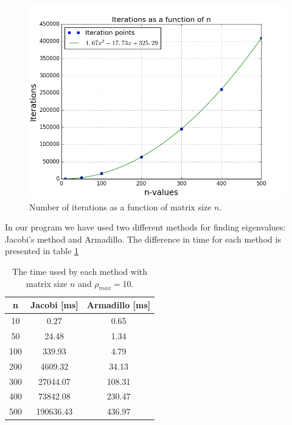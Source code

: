 \documentclass{article}
\begin{document}
\begin{figure}[H]
\centering
\includegraphics[scale=0.5]{../figures/iterations.png}
\caption{Number of iterations as a function of matrix size $n$.}
\label{fig:iterations}
\end{figure}
In our program we have used two different methods for finding eigenvalues: Jacobi's method and Armadillo. The difference in time for each method is presented in table \ref{tab:time}
\begin{table}[H]
\centering
\caption{The time used by each method with matrix size $n$ and $\rho_{max} = 10$.}
\begin{tabular}{c|c|c}
n & Jacobi [ms] & Armadillo [ms] \\ \hline
10 &  0.27 & 0.65        \\ \hline
50 &  24.48 & 1.34       \\ \hline
100 & 339.93 & 4.79      \\ \hline 
200 & 4609.32 & 34.13    \\ \hline
300 & 27044.07 & 108.31  \\ \hline
400 & 73842.08 & 230.47  \\ \hline
500 & 190636.43 & 436.97 \\ \hline
\end{tabular}
\label{tab:time}
\end{table}
\end{document}
